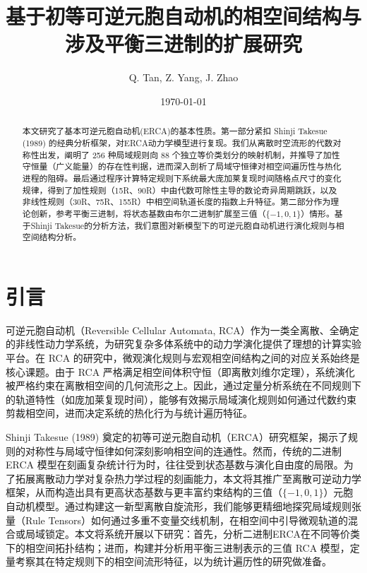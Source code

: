 \documentclass[reprint, amsmath, amssymb, aps, physrev,prb]{revtex4-2}
\begin{document}
\title{基于初等可逆元胞自动机的相空间结构与涉及平衡三进制的扩展研究}
\author{Q. Tan, Z. Yang, J. Zhao}
\date{\today}

\begin{abstract}
本文研究了基本可逆元胞自动机(ERCA)的基本性质。第一部分紧扣 Shinji Takesue (1989) \cite{shinjin} 的经典分析框架，对ERCA动力学模型进行复现。我们从离散时空流形的代数对称性出发，阐明了 256 种局域规则向 88 个独立等价类划分的映射机制，并推导了加性守恒量（广义能量）的存在性判据，进而深入剖析了局域守恒律对相空间遍历性与热化进程的阻碍。最后通过程序计算特定规则下系统最大庞加莱复现时间随格点尺寸的变化规律，得到了加性规则（15R、90R）中由代数可除性主导的数论奇异周期跳跃，以及非线性规则（30R、75R、155R）中相空间轨道长度的指数上升特征。第二部分作为理论创新，参考平衡三进制，将状态基数由布尔二进制扩展至三值（$\{-1, 0, 1\}$）情形。基于Shinji Takesue的分析方法，我们意图对新模型下的可逆元胞自动机进行演化规则与相空间结构分析。
\end{abstract}

\maketitle

\section{引言}

可逆元胞自动机（Reversible Cellular Automata, RCA）作为一类全离散、全确定的非线性动力学系统，为研究复杂多体系统中的动力学演化提供了理想的计算实验平台。在 RCA 的研究中，微观演化规则与宏观相空间结构之间的对应关系始终是核心课题。由于 RCA 严格满足相空间体积守恒（即离散刘维尔定理），系统演化被严格约束在离散相空间的几何流形之上。因此，通过定量分析系统在不同规则下的轨道特性（如庞加莱复现时间），能够有效揭示局域演化规则如何通过代数约束剪裁相空间，进而决定系统的热化行为与统计遍历特征。

Shinji Takesue (1989) 奠定的初等可逆元胞自动机（ERCA）研究框架，揭示了规则的对称性与局域守恒律如何深刻影响相空间的连通性。然而，传统的二进制 ERCA 模型在刻画复杂统计行为时，往往受到状态基数与演化自由度的局限。为了拓展离散动力学对复杂热力学过程的刻画能力，本文将其推广至离散可逆动力学框架，从而构造出具有更高状态基数与更丰富约束结构的三值（$\{-1, 0, 1\}$）元胞自动机模型。通过构建这一新型离散自旋流形，我们能够更精细地探究局域规则张量（Rule Tensors）如何通过多重不变量交线机制，在相空间中引导微观轨道的混合或局域锁定。本文将系统开展以下研究：首先，分析二进制ERCA在不同等价类下的相空间拓扑结构；进而，构建并分析用平衡三进制表示的三值 RCA 模型，定量考察其在特定规则下的相空间流形特征，以为统计遍历性的研究做准备。
\end{document}
